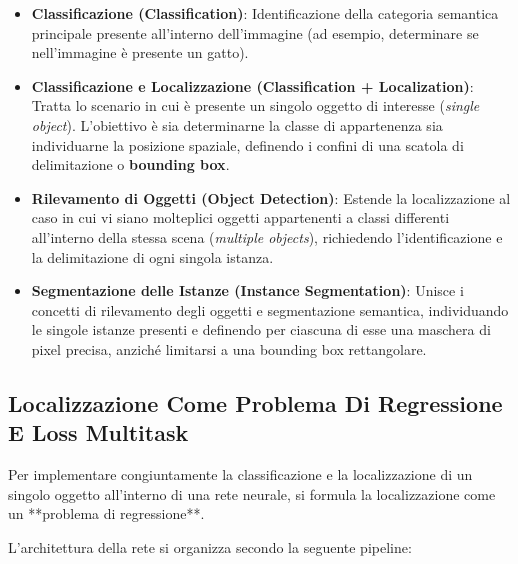﻿\documentclass[11pt, a4paper]{article}
\begin{document}
\begin{itemize}[noitemsep]
    \item \textbf{Classificazione (Classification)}: Identificazione della categoria semantica principale presente all'interno dell'immagine (ad esempio, determinare se nell'immagine è presente un gatto).
    \item \textbf{Classificazione e Localizzazione (Classification + Localization)}: Tratta lo scenario in cui è presente un singolo oggetto di interesse (\emph{single object}). L'obiettivo è sia determinarne la classe di appartenenza sia individuarne la posizione spaziale, definendo i confini di una scatola di delimitazione o \textbf{bounding box}.
    \item \textbf{Rilevamento di Oggetti (Object Detection)}: Estende la localizzazione al caso in cui vi siano molteplici oggetti appartenenti a classi differenti all'interno della stessa scena (\emph{multiple objects}), richiedendo l'identificazione e la delimitazione di ogni singola istanza.
    \item \textbf{Segmentazione delle Istanze (Instance Segmentation)}: Unisce i concetti di rilevamento degli oggetti e segmentazione semantica, individuando le singole istanze presenti e definendo per ciascuna di esse una maschera di pixel precisa, anziché limitarsi a una bounding box rettangolare.
\end{itemize}

\newpage

\subsection{Localizzazione Come Problema Di Regressione E Loss Multitask}

Per implementare congiuntamente la classificazione e la localizzazione di un singolo oggetto all'interno di una rete neurale, si formula la localizzazione come un **problema di regressione**.

L'architettura della rete si organizza secondo la seguente pipeline:
\end{document}

